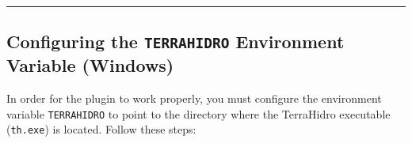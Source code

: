 \documentclass[
]{book}
\theoremstyle{definition}
\theoremstyle{definition}
\theoremstyle{definition}
\theoremstyle{definition}
\theoremstyle{remark}
\begin{document}
\begin{center}\rule{0.5\linewidth}{0.5pt}\end{center}

\subsection*{\texorpdfstring{Configuring the \texttt{TERRAHIDRO} Environment Variable (Windows)}{Configuring the TERRAHIDRO Environment Variable (Windows)}}\label{configuring-the-terrahidro-environment-variable-windows}

In order for the plugin to work properly, you must configure the environment variable \texttt{TERRAHIDRO} to point to the directory where the TerraHidro executable (\texttt{th.exe}) is located. Follow these steps:
\end{document}
